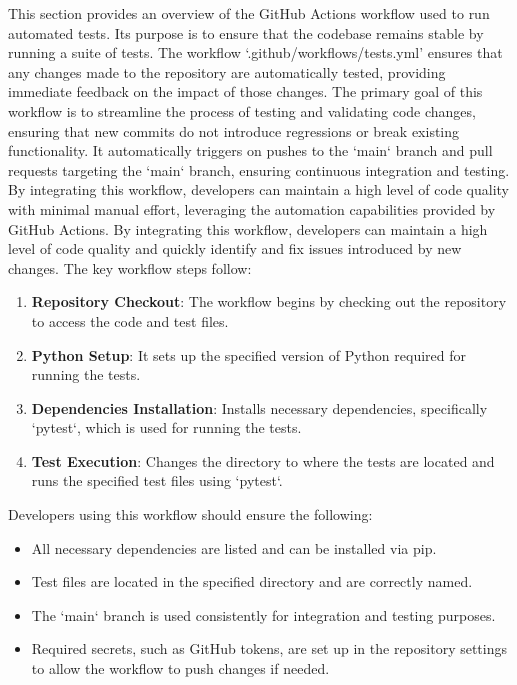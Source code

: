 This section provides an overview of the GitHub Actions workflow used to run automated tests. Its purpose is to ensure that the codebase remains stable by running a suite of tests. The workflow `.github/workflows/tests.yml' ensures that any changes made to the repository are automatically tested, providing immediate feedback on the impact of those changes. The primary goal of this workflow is to streamline the process of testing and validating code changes, ensuring that new commits do not introduce regressions or break existing functionality. It automatically triggers on pushes to the `main` branch and pull requests targeting the `main` branch, ensuring continuous integration and testing. By integrating this workflow, developers can maintain a high level of code quality with minimal manual effort, leveraging the automation capabilities provided by GitHub Actions. By integrating this workflow, developers can maintain a high level of code quality and quickly identify and fix issues introduced by new changes. The key workflow steps follow:

\begin{enumerate}
\item \textbf{Repository Checkout}: The workflow begins by checking out the repository to access the code and test files.
\item \textbf{Python Setup}: It sets up the specified version of Python required for running the tests.
\item \textbf{Dependencies Installation}: Installs necessary dependencies, specifically `pytest`, which is used for running the tests.
\item \textbf{Test Execution}: Changes the directory to where the tests are located and runs the specified test files using `pytest`.
\end{enumerate}

Developers using this workflow should ensure the following:

\begin{itemize}
\item All necessary dependencies are listed and can be installed via pip.
\item Test files are located in the specified directory and are correctly named.
\item The `main` branch is used consistently for integration and testing purposes.
\item Required secrets, such as GitHub tokens, are set up in the repository settings to allow the workflow to push changes if needed.
\end{itemize}





